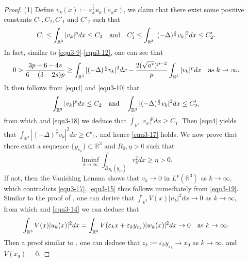 \documentclass[reqno, 11pt]{amsart} %
\numberwithin{equation}{section}
\begin{document}
	\begin{proof}
		(1) Define $v_{k}(x):=\varepsilon_{k}^{\frac{3}{2}}u_{k}(\varepsilon_{k}x)$, we claim that there exist some positive constants $C_{1}, C_{2}, C'_{1}$ and $C'_{2}$ such that
		\begin{equation}\label{equ3-17}
			C_{1}\leq\int_{\mathbb{R}^{3}}|v_{k}|^{p}dx\leq C_{2}\quad \hbox{and}\quad C'_{1}\leq\int_{\mathbb{R}^{3}}|(-\Delta)^{\frac{s}{2}}v_{k}|^{2}dx\leq C'_{2}.
		\end{equation}
		In fact, similar to \eqref{equ3-9}-\eqref{equ3-12}, one can see that
		\begin{equation}\label{equ3-18}
			0>\frac{3p-6-4s}{6-(3-2s)p}\geq\int_{\mathbb{R}^{3}}|(-\Delta)^{\frac{s}{2}}  v_{k}|^{2}dx-\frac{2(\sqrt{a^{\ast}})^{p-2}}{p}\int_{\mathbb{R}^{3}}|v_{k}|^{p}dx\quad \hbox{as $k\rightarrow\infty$}.
		\end{equation}
		It then follows from \eqref{equ4} and \eqref{equ3-10} that
		\begin{equation*}
			\int_{\mathbb{R}^{3}}|v_{k}|^{p}dx\leq C_{2}\quad \hbox{and}\quad \int_{\mathbb{R}^{3}}|(-\Delta)^{\frac{s}{2}}v_{k}|^{2}dx\leq C'_{2},
		\end{equation*}
		from which and \eqref{equ3-18} we deduce that $\int_{\mathbb{R}^{3}}|v_{k}|^{p}dx\geq C_{1}$. Then \eqref{equ4} yields that $\int_{\mathbb{R}^{3}}|(-\Delta)^{\frac{s}{2}}v_{k}|^{2}dx\geq C'_{1}$, and hence \eqref{equ3-17} holds. We now prove that there exist a sequence $\{y_{\varepsilon_{k}}\}\subset\mathbb{R}^{3}$ and $R_{0}, \eta>0$ such that
		\begin{equation}\label{equ3-19}
			\liminf_{k\rightarrow\infty}\int_{B_{R_{0}}(y_{\varepsilon_{k}})}v_{k}^{2}dx\geq\eta>0.
		\end{equation}
		If not, then the Vanishing Lemma shows that $v_{k}\rightarrow 0$ in $L^{p}(\mathbb{R}^{3})$ as $k\rightarrow\infty$, which contradicts \eqref{equ3-17}, \eqref{equ3-15} thus follows immediately from \eqref{equ3-19}. Similar to the proof of \cite[Lemma 5.2]{LL}, one can derive that
		$\int_{\mathbb{R}^{3}}V(x)|u_{k}|^{2}dx\rightarrow0$ as $k\rightarrow\infty$, from which and \eqref{equ3-14} we can deduce that
		\begin{equation*}
			\int_{\mathbb{R}^{3}}V(x)|u_{k}(x)|^{2}dx=	\int_{\mathbb{R}^{3}}V(\varepsilon_{k}x+\varepsilon_{k}y_{\varepsilon_{k}})|w_{k}(x)|^{2}dx \rightarrow0\quad \hbox{as $k\rightarrow\infty$}.
		\end{equation*}
		Then a proof similar to \cite[Lemma 2.5]{G}, one can deduce that $z_{k}:=\varepsilon_{k}y_{\varepsilon_{k}}\rightarrow x_{0}$ as $k\rightarrow\infty$, and $V(x_{0})=0$.
		

\end{proof}
\end{document}
